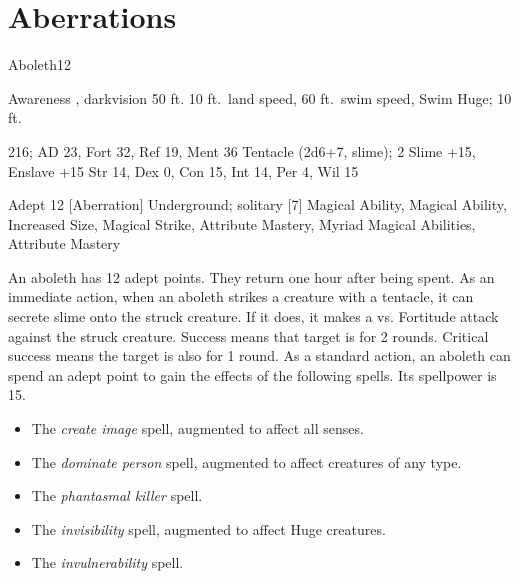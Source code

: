 \section{Aberrations}

    \begin{monsection}{Aboleth}{12}
        \begin{spellcontent}
            \begin{spelltargetinginfo}
                \pari {} Awareness , darkvision 50 ft.
                \pari {} 10 ft.\ land speed, 60 ft.\ swim speed, Swim 
                \pari {} Huge;  10 ft.
            \end{spelltargetinginfo}
            \begin{spelleffects}
                \pari {} 216;  AD 23, Fort 32, Ref 19, Ment 36
                \pari {} Tentacle  (2d6+7, slime);  2
                \pari {} Slime +15, Enslave +15
                \pari {} Str 14, Dex 0, Con 15, Int 14, Per 4, Wil 15
            \end{spelleffects}
        \end{spellcontent}
        \begin{spellfooter}
            \pari {} Adept 12 [Aberration]
            \pari {} Underground; solitary
            \pari {} [7] Magical Ability, Magical Ability, Increased Size, Magical Strike, Attribute Mastery, Myriad Magical Abilities, Attribute Mastery
        \end{spellfooter}
    \end{monsection}
     An aboleth has 12 adept points.
    They return one hour after being spent.
     As an immediate action, when an aboleth strikes a creature with a tentacle, it can secrete slime onto the struck creature.
    If it does, it makes a  vs. Fortitude attack against the struck creature.
    Success means that target is \sickened for 2 rounds.
    Critical success means the target is also \nauseated for 1 round.
     As a standard action, an aboleth can spend an adept point to gain the effects of the following spells.
    Its spellpower is 15.
    \begin{itemize}
        \item The \textit{create image} spell, augmented to affect all senses.
        \item The \textit{dominate person} spell, augmented to affect creatures of any type.
        \item The \textit{phantasmal killer} spell.
        \item The \textit{invisibility} spell, augmented to affect Huge creatures.
        \item The \textit{invulnerability} spell.
    \end{itemize}
